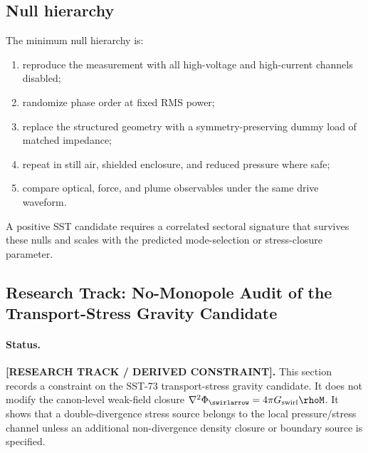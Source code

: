 \subsection{Null hierarchy}

The minimum null hierarchy is:
\begin{enumerate}
    \item reproduce the measurement with all high-voltage and high-current channels disabled;
    \item randomize phase order at fixed RMS power;
    \item replace the structured geometry with a symmetry-preserving dummy load of matched impedance;
    \item repeat in still air, shielded enclosure, and reduced pressure where safe;
    \item compare optical, force, and plume observables under the same drive waveform.
\end{enumerate}
A positive SST candidate requires a correlated sectoral signature that survives
these nulls and scales with the predicted mode-selection or stress-closure
parameter.



\subsection{Research Track: No-Monopole Audit of the Transport-Stress Gravity Candidate}
\label{sec:rt_no_monopole_transport_stress_audit}

\paragraph{Status.}
\textbf{[RESEARCH TRACK / DERIVED CONSTRAINT].}
This section records a constraint on the SST-73 transport-stress gravity
candidate.  It does not modify the canon-level weak-field closure
\(\nabla^2\Phi_{\swirlarrow}=4\pi G_{\mathrm{swirl}}\rhoM\).  It shows that a
double-divergence stress source belongs to the local pressure/stress channel
unless an additional non-divergence density closure or boundary source is
specified.

